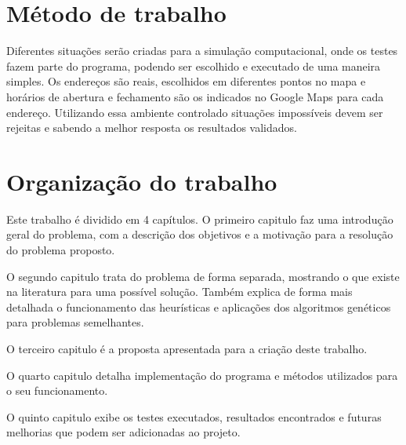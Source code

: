 \section{Método de trabalho}

Diferentes situações serão criadas para a simulação computacional, onde os testes fazem parte do programa, podendo ser escolhido e executado de uma maneira simples. Os endereços são reais, escolhidos em diferentes pontos no mapa e horários de abertura e fechamento são os indicados no Google Maps para cada endereço. 
Utilizando essa ambiente controlado situações impossíveis devem ser rejeitas e sabendo a melhor resposta os resultados validados.

\section{Organização do trabalho}
Este trabalho é dividido em 4 capítulos. 
O primeiro capitulo faz uma introdução geral do problema, com a descrição dos objetivos e a motivação para a resolução do problema proposto.

O segundo capitulo trata do problema de forma separada, mostrando o que existe na literatura para uma possível solução. 
Também explica de forma mais detalhada o funcionamento das heurísticas e aplicações dos algoritmos genéticos para problemas semelhantes.

O terceiro capitulo é a proposta apresentada para a criação deste trabalho.

O quarto capitulo detalha implementação do programa e métodos utilizados para o seu funcionamento.

O quinto capitulo exibe os testes executados, resultados encontrados e futuras melhorias que podem ser adicionadas ao projeto.
